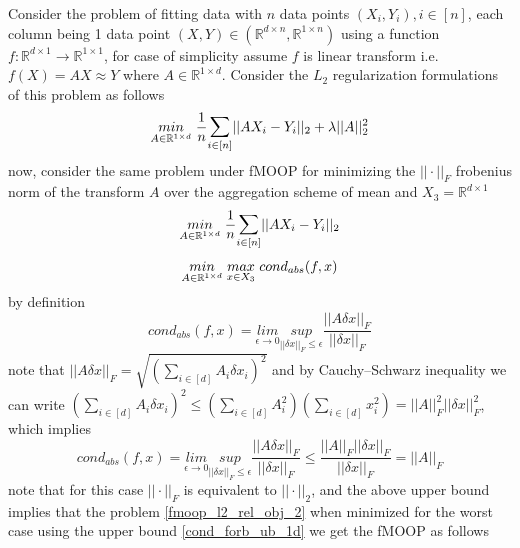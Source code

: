 Consider the problem of fitting data with $n$ data points $(X_i,Y_i), i \in [n]$, each column being 1 data point $(X,Y) \in (\mathbb{R}^{d\times n},\mathbb{R}^{1\times n})$ using a function $f:\mathbb{R}^{d\times 1}\to \mathbb{R}^{1\times 1}$, for case of simplicity assume $f$ is linear transform i.e. $f(X) = AX \approx Y$ where $A \in \mathbb{R}^{1\times d}$.
\newline Consider the $L_2$ regularization formulations of this problem as follows
\begin{equation} \label{l2_reg_prob_obj}
    \underset{A \in \mathbb{R}^{1\times d}}{min}\hspace{1mm} \frac{1}{n}\mathlarger{\sum}_{i\in [n]} ||AX_i-Y_i||_2 + \lambda ||A||^{2}_{2}
\end{equation}
now, consider the same problem under fMOOP for minimizing the $||\cdot||_{F}$ frobenius norm of the transform $A$ over the aggregation scheme of mean and $X_3 = \mathbb{R}^{d\times 1}$
\begin{equation} \label{fmoop_l2_rel_obj_1}
    \underset{A \in \mathbb{R}^{1\times d}}{min}\hspace{1mm} \frac{1}{n}\mathlarger{\sum}_{i\in [n]} ||AX_i-Y_i||_2
\end{equation}
\begin{equation} \label{fmoop_l2_rel_obj_2}
    \underset{A \in \mathbb{R}^{1\times d}}{min}\hspace{1mm} \underset{x \in X_3}{max}\hspace{1mm} cond_{abs}(f,x)
\end{equation}
by definition 
\begin{equation}
    cond_{abs}(f,x) = \underset{\epsilon \to 0}{lim}\underset{||\delta x||_F\le \epsilon}{sup} \frac{||A\delta x||_F}{||\delta x||_F}
\end{equation}
note that $||A\delta x||_F = \sqrt{(\sum_{i\in [d]} A_i\delta x_i)^2}$ and by Cauchy–Schwarz inequality we can write $(\sum_{i\in [d]} A_i\delta x_i)^2 \le (\sum_{i\in [d]} A^2_i)(\sum_{i\in [d]} x^2_i) =||A||^2_F||\delta x||^2_F $, which implies 
\begin{equation} \label{cond_forb_ub_1d}
    cond_{abs}(f,x) = \underset{\epsilon \to 0}{lim}\underset{||\delta x||_F\le \epsilon}{sup} \frac{||A\delta x||_F}{||\delta x||_F} \le \frac{||A||_F||\delta x||_F}{||\delta x||_F} = ||A||_F
\end{equation}
note that for this case $||\cdot||_F$ is equivalent to $||\cdot||_2$, and the above upper bound implies that the problem \ref{fmoop_l2_rel_obj_2} when minimized for the worst case using the upper bound \ref{cond_forb_ub_1d} we get the fMOOP as follows
